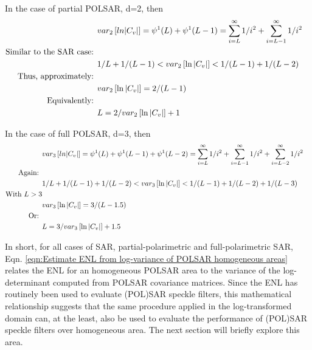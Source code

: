 In the case of partial POLSAR, d=2, then
\begin{align*}
&  var_2 \left[ ln|C_v| \right] = \psi^1(L) + \psi^1(L-1)     = \sum^{\infty}_{i=L}1/i^2 + \sum^{\infty}_{i=L-1}1/i^2 &\\
\noindent \text{Similar to the SAR case: } \\
&  1/L + 1/(L-1) < var_2 \left[ \ln |C_v| \right] < 1/(L-1) + 1/(L-2) & \\
\noindent \text{Thus, approximately: } \\
& var_2 \left[ \ln |C_v| \right] = 2/(L-1) & \\
\noindent \text{Equivalently: } \\
& L = 2/var_2 \left[ \ln |C_v| \right] + 1 & \\
\end{align*}

In the case of full POLSAR, d=3, then
\begin{align*}
&  var_3 \left[ ln|C_v| \right] = \psi^1(L) + \psi^1(L-1) + \psi^1(L-2)    = \sum^{\infty}_{i=L}1/i^2 + \sum^{\infty}_{i=L-1}1/i^2  + \sum^{\infty}_{i=L-2}1/i^2 & \\
\noindent \text{Again: }  \\
& 1/L + 1/(L-1) + 1/(L-2) < var_3 \left[ \ln |C_v| \right] < 1/(L-1) + 1/(L-2) + 1/(L-3) &\\
\noindent \text{With } L>3 \\
& var_3 \left[ \ln |C_v| \right] = 3/(L-1.5) &\\
\noindent \text{Or: }\\
& L = 3/var_3 \left[ \ln |C_v| \right] + 1.5 &
\end{align*}

In short, for all cases of SAR, partial-polarimetric and full-polarimetric SAR, Eqn. \ref{eqn:Estimate ENL from log-variance of POLSAR homogeneous areas} relates the ENL for an homogeneous POLSAR area to the variance of the log-determinant computed from POLSAR covariance matrices.
Since the ENL has routinely been used to evaluate (POL)SAR speckle filters, this mathematical relationship suggests that the same procedure applied in the log-transformed domain can, at the least, also be used to evaluate the performance of (POL)SAR speckle filters over homogeneous area.
The next section will briefly explore this area.

